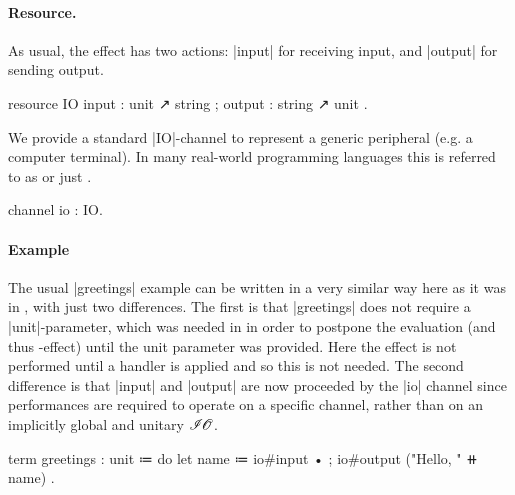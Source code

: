 \paragraph{Resource.}
%
As usual, the \IO effect has two actions: \code|input| for receiving input, and \code|output| for sending output.
%
\begin{program}[caption={Resource for \IO}]
resource IO
  { input  : unit ↗ string
  ; output : string ↗ unit }.
\end{program}

We provide a standard \code|IO|-channel to represent a generic \IO peripheral (e.g. a computer terminal).
In many real-world programming languages this is referred to as  or just .
%
\begin{program}[caption={Channel for \IO}]
channel io : IO.
\end{program}

\paragraph{Example}
%
The usual \code|greetings| example can be written in a very similar way here as it was in \LangB, with just two differences.
The first is that \code|greetings| does not require a \code|unit|-parameter,
which was needed in \LangB in order to postpone the evaluation (and thus \IO-effect) until the unit parameter was provided.
Here the \IO effect is not performed until a handler is applied and so this is not needed.
The second difference is that \code|input| and \code|output| are now proceeded by the \code|io| channel since performances are required to operate on a specific channel, rather than on an implicitly global and unitary $\mathscr{I\hspace{-0.1em}O}$.
%
\begin{program}
term greetings : unit
  ≔ do
      { let name ≔ io#input •
      ; io#output ("Hello, " ⧺ name) }.
\end{program}

